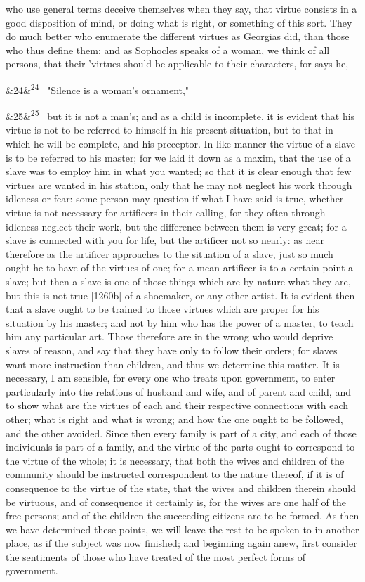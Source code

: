 \documentclass[12pt]{article}
\newcommand{\para}[1][]{\par\noindent\ifx&#1&\else\textsuperscript{\footnotesize #1}~\fi}
\begin{document}
who use general terms deceive themselves when they say, that virtue consists in a good disposition of mind, or doing what is right, or something of this sort. They do much better who enumerate the different virtues as Georgias did, than those who thus define them; and as Sophocles speaks of a woman, we think of all persons, that their 'virtues should be applicable to their characters, for says he,

\para[24] "Silence is a woman's ornament,"

\para[25] but it is not a man's; and as a child is incomplete, it is evident that his virtue is not to be referred to himself in his present situation, but to that in which he will be complete, and his preceptor. In like manner the virtue of a slave is to be referred to his master; for we laid it down as a maxim, that the use of a slave was to employ him in what you wanted; so that it is clear enough that few virtues are wanted in his station, only that he may not neglect his work through idleness or fear: some person may question if what I have said is true, whether virtue is not necessary for artificers in their calling, for they often through idleness neglect their work, but the difference between them is very great; for a slave is connected with you for life, but the artificer not so nearly: as near therefore as the artificer approaches to the situation of a slave, just so much ought he to have of the virtues of one; for a mean artificer is to a certain point a slave; but then a slave is one of those things which are by nature what they are, but this is not true [1260b] of a shoemaker, or any other artist. It is evident then that a slave ought to be trained to those virtues which are proper for his situation by his master; and not by him who has the power of a master, to teach him any particular art. Those therefore are in the wrong who would deprive slaves of reason, and say that they have only to follow their orders; for slaves want more instruction than children, and thus we determine this matter. It is necessary, I am sensible, for every one who treats upon government, to enter particularly into the relations of husband and wife, and of parent and child, and to show what are the virtues of each and their respective connections with each other; what is right and what is wrong; and how the one ought to be followed, and the other avoided. Since then every family is part of a city, and each of those individuals is part of a family, and the virtue of the parts ought to correspond to the virtue of the whole; it is necessary, that both the wives and children of the community should be instructed correspondent to the nature thereof, if it is of consequence to the virtue of the state, that the wives and children therein should be virtuous, and of consequence it certainly is, for the wives are one half of the free persons; and of the children the succeeding citizens are to be formed. As then we have determined these points, we will leave the rest to be spoken to in another place, as if the subject was now finished; and beginning again anew, first consider the sentiments of those who have treated of the most perfect forms of government.
\end{document}
